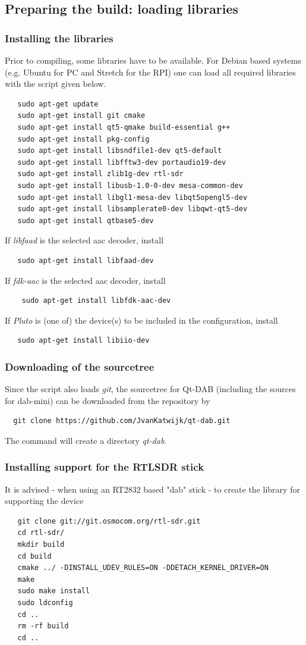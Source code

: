 \documentclass[12pt]{article}
\begin{document}
\subsection{Preparing the build: loading libraries}
\subsubsection{Installing the libraries}
Prior to compiling, some libraries have to be available.
For Debian based systems (e.g. Ubuntu for PC and Stretch for the RPI) one
can load all required libraries with the script given below.
{\small
\begin{verbatim}
   sudo apt-get update
   sudo apt-get install git cmake
   sudo apt-get install qt5-qmake build-essential g++
   sudo apt-get install pkg-config
   sudo apt-get install libsndfile1-dev qt5-default
   sudo apt-get install libfftw3-dev portaudio19-dev 
   sudo apt-get install zlib1g-dev rtl-sdr
   sudo apt-get install libusb-1.0-0-dev mesa-common-dev
   sudo apt-get install libgl1-mesa-dev libqt5opengl5-dev
   sudo apt-get install libsamplerate0-dev libqwt-qt5-dev
   sudo apt-get install qtbase5-dev
\end{verbatim}
}

If {\em libfaad} is the selected aac decoder, install
\begin{verbatim}
   sudo apt-get install libfaad-dev 
\end{verbatim}
If {\em fdk-aac} is the selected aac decoder, install
\begin{verbatim}
	sudo apt-get install libfdk-aac-dev
\end{verbatim}

If {\em Pluto} is (one of) the device(s) to be included in the
configuration, install
\begin{verbatim}
   sudo apt-get install libiio-dev
\end{verbatim}
\subsubsection{Downloading of the sourcetree}
Since the script also loads {\em git},
the sourcetree for Qt-DAB (including the sources for dab-mini)
can be downloaded from the repository by
{\small
\begin{verbatim}
  git clone https://github.com/JvanKatwijk/qt-dab.git
\end{verbatim}
}
The command will create a directory {\em qt-dab}.
\subsubsection{Installing support for the RTLSDR stick}
It is advised - when using an RT2832 based "dab" stick - to create
the library for supporting the device
{\small
\begin{verbatim}
   git clone git://git.osmocom.org/rtl-sdr.git
   cd rtl-sdr/
   mkdir build
   cd build
   cmake ../ -DINSTALL_UDEV_RULES=ON -DDETACH_KERNEL_DRIVER=ON
   make
   sudo make install
   sudo ldconfig
   cd ..
   rm -rf build
   cd ..
\end{verbatim}
}
\end{document}
